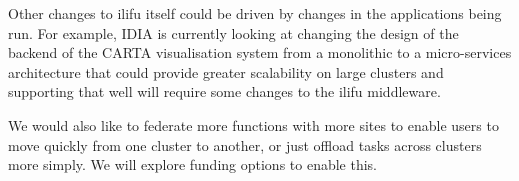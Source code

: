 \documentclass{iau_FM}
\begin{document}
Other changes to ilifu itself could be driven by changes in the applications being run.
For example, IDIA is currently looking at changing the design of the backend of the 
CARTA visualisation system from a monolithic to a micro-services architecture that could
provide greater scalability on large clusters and supporting that well will require
some changes to the ilifu middleware.

We would also like to federate more functions with more sites to enable users to move quickly
from one cluster to another, or just offload tasks across clusters more simply. We will
explore funding options to enable this.


%
%

\printbibliography
\end{document}
